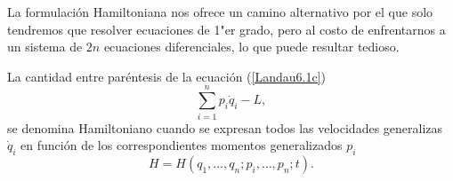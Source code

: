 \documentclass[12pt, spanish, a4paper, ]{article}
\begin{document}
La formulación Hamiltoniana nos ofrece un camino alternativo por el que solo tendremos que resolver ecuaciones de 1"er grado, pero al costo de enfrentarnos a un sistema de \(2n\) ecuaciones diferenciales, lo que puede resultar tedioso.

La cantidad entre paréntesis de la ecuación (\ref{Landau6.1c}) 
\begin{equation}\label{Lanczos62.3}
	\sum_{i=1}^n p_i \dot{q}_i - L ,
    \tag{Lanczos 62.3}
\end{equation}
se denomina Hamiltoniano cuando se expresan todos las velocidades generalizas \(\dot{q}_i\) en función de los correspondientes momentos generalizados \(p_i\)
\begin{equation}\label{Lanczos62.4}
	H =  H(q_1,\ldots, q_n;p_i, \ldots, p_n; t) .
    \tag{Lanczos 62.4}
\end{equation}
\end{document}
